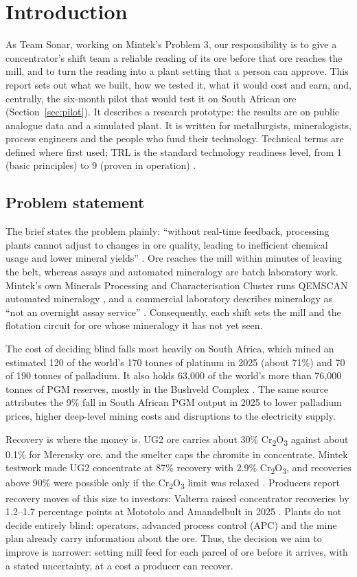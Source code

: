 \documentclass[10pt,a4paper,twocolumn]{article}
\newcommand{\cro}{Cr\textsubscript{2}O\textsubscript{3}}
\begin{document}
\section{Introduction}

As Team Sonar, working on Mintek's Problem 3, our responsibility is to give a concentrator's shift team a reliable reading of its ore before that ore reaches the mill, and to turn the reading into a plant setting that a person can approve. This report sets out what we built, how we tested it, what it would cost and earn, and, centrally, the six-month pilot that would test it on South African ore (Section~\ref{sec:pilot}). It describes a research prototype: the results are on public analogue data and a simulated plant. It is written for metallurgists, mineralogists, process engineers and the people who fund their technology. Technical terms are defined where first used; TRL is the standard technology readiness level, from 1 (basic principles) to 9 (proven in operation) \cite{trl}.

\subsection{Problem statement}

The brief states the problem plainly: ``without real-time feedback, processing plants cannot adjust to changes in ore quality, leading to inefficient chemical usage and lower mineral yields'' \cite{brief}. Ore reaches the mill within minutes of leaving the belt, whereas assays and automated mineralogy are batch laboratory work. Mintek's own Minerals Processing and Characterisation Cluster runs QEMSCAN automated mineralogy \cite{moodley2026}, and a commercial laboratory describes mineralogy as ``not an overnight assay service'' \cite{als}. Consequently, each shift sets the mill and the flotation circuit for ore whose mineralogy it has not yet seen.


The cost of deciding blind falls most heavily on South Africa, which mined an estimated 120 of the world's 170 tonnes of platinum in 2025 (about 71\%) and 70 of 190 tonnes of palladium. It also holds 63,000 of the world's more than 76,000 tonnes of PGM reserves, mostly in the Bushveld Complex \cite{usgs2026}. The same source attributes the 9\% fall in South African PGM output in 2025 to lower palladium prices, higher deep-level mining costs and disruptions to the electricity supply.

Recovery is where the money is. UG2 ore carries about 30\% \cro{} against about 0.1\% for Merensky ore, and the smelter caps the chromite in concentrate. Mintek testwork made UG2 concentrate at 87\% recovery with 2.9\% \cro{}, and recoveries above 90\% were possible only if the \cro{} limit was relaxed \cite{jones2005}. Producers report recovery moves of this size to investors: Valterra raised concentrator recoveries by 1.2--1.7 percentage points at Mototolo and Amandelbult in 2025 \cite{valterra2025}. Plants do not decide entirely blind: operators, advanced process control (APC) and the mine plan already carry information about the ore. Thus, the decision we aim to improve is narrower: setting mill feed for each parcel of ore before it arrives, with a stated uncertainty, at a cost a producer can recover.
\end{document}
